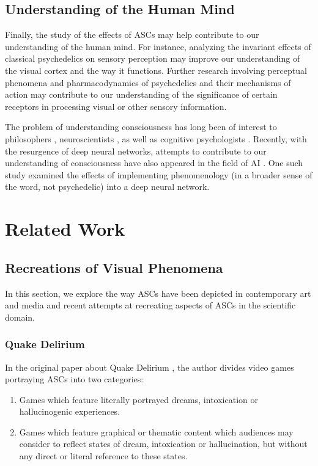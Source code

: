 \subsection{Understanding of the Human Mind}
Finally, the study of the effects of \acp{ASC} may help contribute to our understanding of the human mind. For instance, analyzing the invariant effects of classical psychedelics on sensory perception may improve our understanding of the visual cortex and the way it functions.
Further research involving perceptual phenomena and pharmacodynamics of psychedelics and their mechanisms of action may contribute to our understanding of the significance of certain receptors in processing visual or other sensory information.

The problem of understanding consciousness has long been of interest to philosophers \autocite{block1993consciousness}, neuroscientists \autocite{crick1990towards}, as well as cognitive psychologists \autocite{dehaene2014consciousness}. Recently, with the resurgence of deep neural networks, attempts to contribute to our understanding of consciousness have also appeared in the field of \ac{AI} \autocites{bengio2017consciousness}{reggia2020artificial}. One such study \autocite{bensemann2021effects} examined the effects of implementing phenomenology (in a broader sense of the word, not psychedelic) into a deep neural network.

\section{Related Work}

\subsection{Recreations of Visual Phenomena}
In this section, we explore the way \acp{ASC} have been depicted in contemporary art and media and recent attempts at recreating aspects of \acp{ASC} in the scientific domain.

\subsubsection{Quake Delirium}
In the original paper about Quake Delirium \autocite{weinel2011quake}, the author divides video games portraying \acp{ASC} into two categories:

\begin{enumerate}
    \item Games which feature literally portrayed dreams, intoxication or hallucinogenic experiences.
    \item Games which feature graphical or thematic content which audiences may consider to reflect states of dream, intoxication or hallucination, but without any direct or literal reference to these states.
\end{enumerate}

